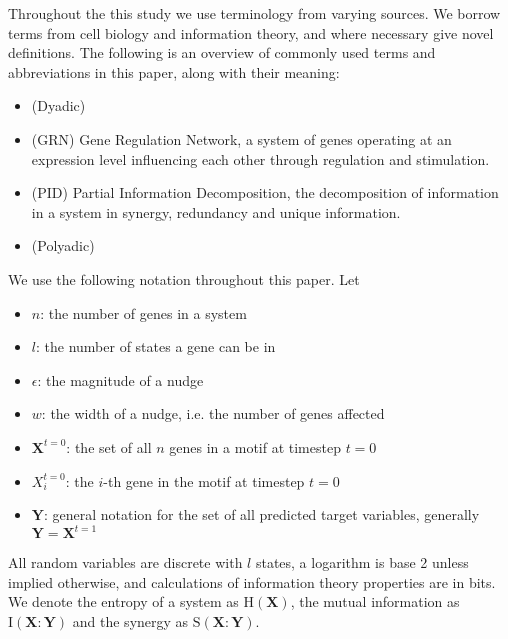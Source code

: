 \documentclass[../main.tex]{subfiles}
\begin{document}
Throughout the this study we use terminology from varying sources.
We borrow terms from cell biology and information theory, and where necessary give novel definitions.
The following is an overview of commonly used terms and abbreviations in this paper, along with their meaning:

\begin{itemize}
\item (Dyadic)
\item (GRN) Gene Regulation Network, a system of genes operating at an expression level influencing each other through regulation and stimulation.
\item (PID) Partial Information Decomposition, the decomposition of information in a system in synergy, redundancy and unique information.
\item (Polyadic)
\end{itemize}

We use the following notation throughout this paper. Let
\begin{itemize}
\item[] $n$: the number of genes in a system
\item[] $l$: the number of states a gene can be in
\item[] $\epsilon$: the magnitude of a nudge
\item[] $w$: the width of a nudge, i.e. the number of genes affected
\item[] $\mathbf{X}^{t=0}$: the set of all $n$ genes in a motif at timestep $t=0$
\item[] $X_i^{t=0}$: the $i$-th gene in the motif at timestep $t=0$
\item[] $\mathbf{Y}$: general notation for the set of all predicted target variables, generally $\mathbf{Y} = \mathbf{X}^{t=1}$
\end{itemize}
All random variables are discrete with $l$ states, a logarithm is base 2 unless implied otherwise, and calculations of information theory properties are in bits.
We denote the entropy of a system as $\mathrm{H}(\mathbf{X})$, the mutual information as $\mathrm{I}(\mathbf{X}:\mathbf{Y})$ and the synergy as $\mathrm{S}(\mathbf{X}:\mathbf{Y})$.
\end{document}
